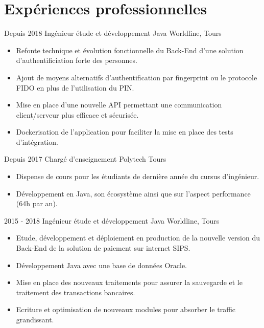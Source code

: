 \documentclass[]{friggeri-cv}
\begin{document}
\section{Expériences professionnelles}
\begin{entrylist}
      \vspace{7pt}    
  \entry
    {Depuis 2018}
    {Ingénieur étude et développement Java}
    {Worldline, Tours}
    {
    \vspace{-0.8\baselineskip}
	\begin{itemize}[leftmargin=*]
		\item Refonte technique et évolution fonctionnelle du Back-End d'une solution d'authentificiation forte des personnes.
		\item Ajout de moyens alternatifs d'authentification par fingerprint ou le protocole FIDO en plus de l'utilisation du PIN. 
		\item Mise en place d'une nouvelle API permettant une communication client/serveur plus efficace et sécurisée.
		\item Dockerisation de l'application pour faciliter la mise en place des tests d'intégration.
	\end{itemize}	    
	}
      \vspace{7pt}    
  \entry
    {Depuis 2017}
    {Chargé d'enseignement}
    {Polytech Tours}
    {
    \vspace{-0.8\baselineskip}
	\begin{itemize}[leftmargin=*]
		\item Dispense de cours pour les étudiants de dernière année du cursus d'ingénieur.
		\item Développement en Java, son écosystème ainsi que sur l'aspect performance (64h par an).
	\end{itemize}
	}
      \vspace{7pt}    
    \entry
    {2015 - 2018}
    {Ingénieur étude et développement Java}
    {Worldline, Tours}
    {
    \vspace{-0.8\baselineskip}
    \begin{itemize}[leftmargin=*]
		\item Etude, développement et déploiement en production de la nouvelle version du Back-End de la solution de paiement sur internet SIPS.
		\item Développement Java avec une base de données Oracle.
		\item Mise  en place des nouveaux traitements pour assurer la sauvegarde et le traitement des transactions bancaires.
		\item Ecriture et optimisation de nouveaux modules pour absorber le traffic grandissant.

\end{itemize}}
\end{entrylist}
\end{document}
